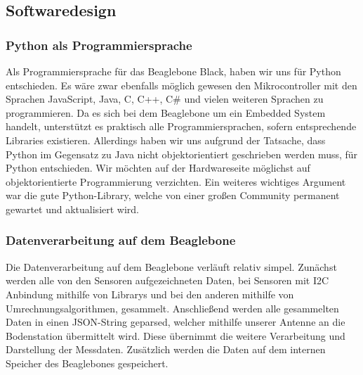 \subsection{Softwaredesign}
\subsubsection{Python als Programmiersprache}
Als Programmiersprache für das Beaglebone Black, haben wir uns für Python entschieden. Es wäre zwar ebenfalls möglich gewesen den Mikrocontroller mit den Sprachen JavaScript, Java, C, C++, C\# und vielen weiteren Sprachen zu programmieren. Da es sich bei dem Beaglebone um ein Embedded System handelt, unterstützt es praktisch alle Programmiersprachen, sofern entsprechende Libraries existieren. Allerdings haben wir uns aufgrund der Tatsache, dass Python im Gegensatz zu Java nicht objektorientiert geschrieben werden muss, für Python entschieden. Wir möchten auf der Hardwareseite möglichst auf objektorientierte Programmierung verzichten. Ein weiteres wichtiges Argument war die gute Python-Library, welche von einer großen Community permanent gewartet und aktualisiert wird.
\subsubsection{Datenverarbeitung auf dem Beaglebone}
Die Datenverarbeitung auf dem Beaglebone verläuft relativ simpel. Zunächst werden alle von den Sensoren aufgezeichneten Daten, bei Sensoren mit I2C Anbindung mithilfe von Librarys und bei den anderen mithilfe von Umrechnungsalgorithmen, gesammelt. Anschließend werden alle gesammelten Daten in einen JSON-String geparsed, welcher mithilfe unserer Antenne an die Bodenstation übermittelt wird. Diese übernimmt die weitere Verarbeitung und Darstellung der Messdaten. Zusätzlich werden die Daten auf dem internen Speicher des Beaglebones gespeichert.

